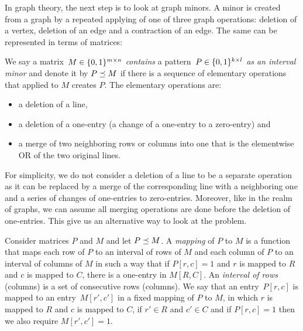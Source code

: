 In graph theory, the next step is to look at graph minors. A minor is created from a graph by a repeated applying of one of three graph operations: deletion of a vertex, deletion of an edge and a contraction of an edge. The same can be represented in terms of matrices:

\begin{defn}
We say a matrix~$M\in\{0,1\}^{m\times n}$ \emph{contains} a pattern~$P\in\{0,1\}^{k\times l}$ \emph{as an interval minor} and denote it by $P\preceq M$ if there is a sequence of elementary operations that applied to $M$ creates $P$. The elementary operations are:
\begin{itemize}
	\item a deletion of a line,
	\item a deletion of a one-entry (a change of a one-entry to a zero-entry) and
	\item a merge of two neighboring rows or columns into one that is the elementwise OR of the two original lines. 
\end{itemize}
\end{defn}

For simplicity, we do not consider a deletion of a line to be a separate operation as it can be replaced by a merge of the corresponding line with a neighboring one and a series of changes of one-entries to zero-entries. Moreover, like in the realm of graphs, we can assume all merging operations are done before the deletion of one-entries. This give us an alternative way to look at the problem.

\begin{defn}
Consider matrices $P$ and $M$ and let $P\preceq M$. A \emph{mapping} of $P$ to $M$ is a function that maps each row of $P$ to an interval of rows of $M$ and each column of $P$ to an interval of columns of $M$ in such a way that if $P[r,c]=1$ and $r$ is mapped to $R$ and $c$ is mapped to $C$, there is a one-entry in $M[R,C]$. An \emph{interval of rows} (columns) is a set of consecutive rows (columns). We say that an entry~$P[r,c]$ is mapped to an entry~$M[r',c']$ in a fixed mapping of $P$ to $M$, in which $r$ is mapped to $R$ and $c$ is mapped to $C$, if $r'\in R$ and $c'\in C$ and if $P[r,c]=1$ then we also require $M[r',c']=1$.
\end{defn}

